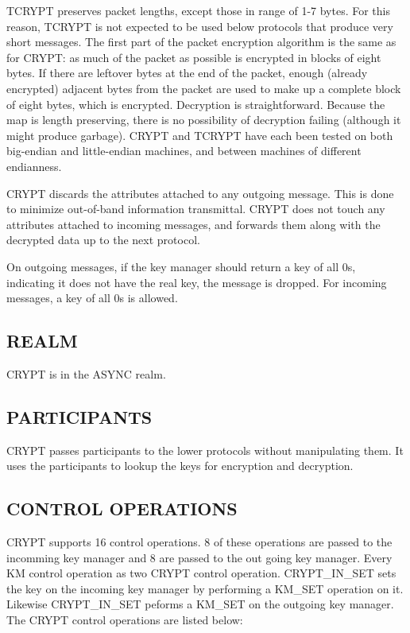 TCRYPT preserves packet lengths, except those in range of 1-7 bytes.
For this reason, TCRYPT is not expected to be used below protocols
that produce very short messages.  The first part of the packet
encryption algorithm is the same as for CRYPT: as much of the packet
as possible is encrypted in blocks of eight bytes.  If there are
leftover bytes at the end of the packet, enough (already encrypted)
adjacent bytes from the packet are used to make up a complete block of
eight bytes, which is encrypted.  Decryption is straightforward.
Because the map is length preserving, there is no possibility of
decryption failing (although it might produce garbage).  CRYPT and
TCRYPT have each been tested on both big-endian and little-endian
machines, and between machines of different endianness.

CRYPT discards the attributes attached to any outgoing message.
This is done to minimize out-of-band information transmittal.
CRYPT does not touch any attributes attached to incoming 
messages, and forwards them along with the decrypted data up to the next 
protocol.

On outgoing messages, if the key manager should return a key of all 0s,
indicating it does not have the real key, the message is dropped.
For incoming messages, a key of all 0s is allowed.

\subsection*{REALM}

CRYPT is in the ASYNC realm.


\subsection*{PARTICIPANTS}

CRYPT passes participants to the lower protocols without manipulating
them.  It uses the participants to lookup the keys for encryption and
decryption.

\subsection*{CONTROL OPERATIONS}

CRYPT supports 16 control operations. 8 of these operations are 
passed to the incomming key manager and 8 are passed to the 
out going key manager. Every KM control operation as two 
CRYPT control operation. CRYPT\_IN\_SET sets the key on the 
incoming key manager by performing a KM\_SET operation on 
it. Likewise CRYPT\_IN\_SET peforms a KM\_SET on the outgoing 
key manager. The CRYPT control operations are listed below:  

